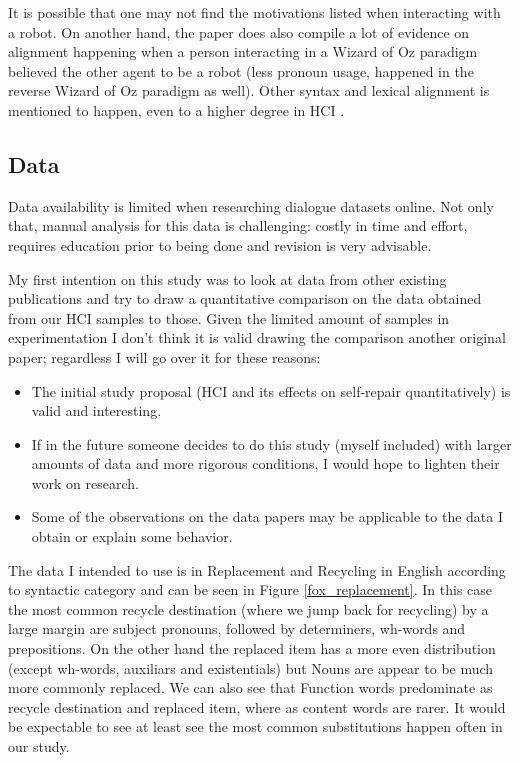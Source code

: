 \documentclass[11pt]{article}
\begin{document}
It is possible that one may not find the motivations listed when interacting with a robot. On another hand, the paper does also compile a lot of evidence on alignment happening when a person interacting in a Wizard of Oz paradigm believed the other agent to be a robot (less pronoun usage, happened in the reverse Wizard of Oz paradigm as well). Other syntax and lexical alignment is mentioned to happen, even to a higher degree in HCI \cite{branigan2003syntactic}.



\subsection{Data}

Data availability is limited when researching dialogue datasets online. Not only that, manual analysis for this data is challenging: costly in time and effort, requires education prior to being done and revision is very advisable. 

My first intention on this study was to look at data from other existing publications and try to draw a quantitative comparison on the data obtained from our HCI samples to those. Given the limited amount of samples in experimentation I don't think it is valid drawing the comparison another original paper; regardless I will go over it for these reasons:
\begin{itemize}
	\item The initial study proposal (HCI and its effects on self-repair quantitatively) is valid and interesting.
	\item If in the future someone decides to do this study (myself included) with larger amounts of data and more rigorous conditions, I would hope to lighten their work on research.
	\item Some of the observations on the data papers may be applicable to the data I obtain or explain some behavior.
\end{itemize}


The data I intended to use is in Replacement and Recycling in English  according to syntactic category  \cite{fox20102487} and can be seen in Figure \ref{fox_replacement}. In this case the most common recycle destination (where we jump back for recycling) by a large margin are subject pronouns, followed by determiners, wh-words and prepositions. On the other hand the replaced item has a more even distribution (except wh-words, auxiliars and existentials) but Nouns are appear to be much more commonly replaced. We can also see that Function words predominate as recycle destination and replaced item, where as content words are rarer. It would be expectable to see at least see the most common substitutions happen often in our study.
\end{document}
